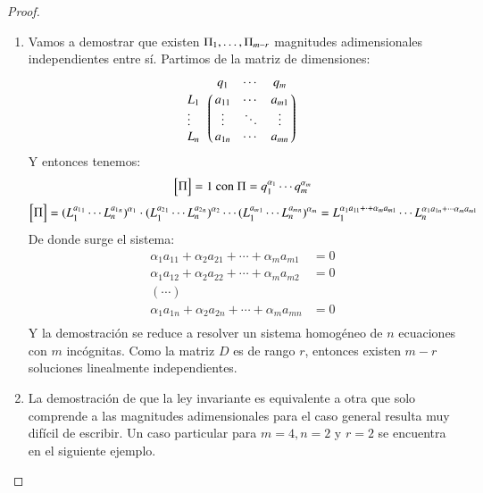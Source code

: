 \begin{proof}$ $
    \begin{enumerate}[(1)]
        \item Vamos a demostrar que existen ${\Pi}_{1}, \ldots, {\Pi}_{m-r}$ magnitudes adimensionales independientes entre sí. Partimos de la matriz de dimensiones:
        $$
            \GDmx{a}
        $$
        Y entonces tenemos:
        $$\mx{\Pi} = 1 \text{ con } \Pi = \Multm{q}{\alpha}$$
        $$
            \mx{\Pi} = (\Multn{L}{{a_1}})^{\alpha_1} \cdot (\Multn{L}{{a_2}})^{\alpha_2} \cdots (\Multn{L}{{a_m}})^{\alpha_m} = L_1^{\alpha_1 a_{11} + \cdot + \alpha_m a_{m1}} \cdots L_n^{\alpha_1 a_{1n} + \cdots \alpha_m a_{m1}}
        $$
        De donde surge el sistema:
        \begin{align*}
            \alpha_1 a_{11} + \alpha_2 a_{21} + \cdots + \alpha_m a_{m1} &= 0\\
            \alpha_1 a_{12} + \alpha_2 a_{22} + \cdots + \alpha_m a_{m2} &= 0\\
            (\cdots)\\
            \alpha_1 a_{1n} + \alpha_2 a_{2n} + \cdots + \alpha_m a_{mn} &= 0\\
        \end{align*}
        Y la demostración se reduce a resolver un sistema homogéneo de $n$ ecuaciones con $m$ incógnitas. Como la matriz $D$ es de rango $r$, entonces existen $m-r$ soluciones linealmente independientes.

        \item La demostración de que la ley invariante es equivalente a otra que solo comprende a las magnitudes adimensionales para el caso general resulta muy difícil de escribir. Un caso particular para $m=4, n=2$ y $r=2$ se encuentra en el siguiente ejemplo.
    \end{enumerate}
\end{proof}

